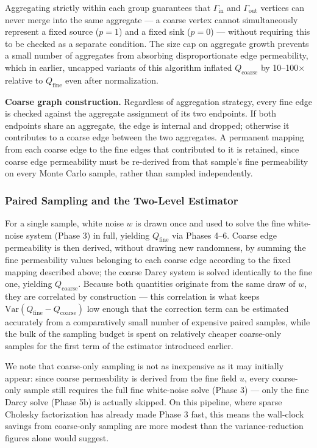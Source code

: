 \documentclass[a4paper,12pt]{amsart}
\numberwithin{equation}{section}
\begin{document}
Aggregating strictly within each group guarantees that $\Gamma_{\text{in}}$ 
and $\Gamma_{\text{out}}$ vertices can never merge into the same 
aggregate — a coarse vertex cannot simultaneously represent a fixed 
source ($p=1$) and a fixed sink ($p=0$) — without requiring this to be 
checked as a separate condition. The size cap on aggregate growth 
prevents a small number of aggregates from absorbing disproportionate 
edge permeability, which in earlier, uncapped variants of this 
algorithm inflated $Q_{\text{coarse}}$ by 10--100$\times$ relative to 
$Q_{\text{fine}}$ even after normalization.

\textbf{Coarse graph construction.} Regardless of aggregation 
strategy, every fine edge is checked against the aggregate assignment 
of its two endpoints. If both endpoints share an aggregate, the edge 
is internal and dropped; otherwise it contributes to a coarse edge 
between the two aggregates. A permanent mapping from each coarse edge 
to the fine edges that contributed to it is retained, since coarse 
edge permeability must be re-derived from that sample's fine 
permeability on every Monte Carlo sample, rather than sampled 
independently.

\subsubsection{Paired Sampling and the Two-Level Estimator}
\label{sec:paired_sampling}

For a single sample, white noise $w$ is drawn once and used to solve 
the fine white-noise system (Phase 3) in full, yielding $Q_{\text{fine}}$ 
via Phases 4--6. Coarse edge permeability is then derived, without 
drawing new randomness, by summing the fine permeability values 
belonging to each coarse edge according to the fixed mapping described 
above; the coarse Darcy system is solved identically to the fine one, 
yielding $Q_{\text{coarse}}$. Because both quantities originate from 
the same draw of $w$, they are correlated by construction — this 
correlation is what keeps $\mathrm{Var}(Q_{\text{fine}} - Q_{\text{coarse}})$ 
low enough that the correction term can be estimated accurately from a 
comparatively small number of expensive paired samples, while the bulk 
of the sampling budget is spent on relatively cheaper coarse-only samples for the 
first term of the estimator introduced earlier.

We note that coarse-only sampling is not as inexpensive as it may 
initially appear: since coarse permeability is derived from the fine 
field $u$, every coarse-only sample still requires the full fine 
white-noise solve (Phase 3) — only the fine Darcy solve (Phase 5b) is 
actually skipped. On this pipeline, where sparse Cholesky factorization 
has already made Phase 3 fast, this means the wall-clock savings from 
coarse-only sampling are more modest than the variance-reduction 
figures alone would suggest.
\end{document}
